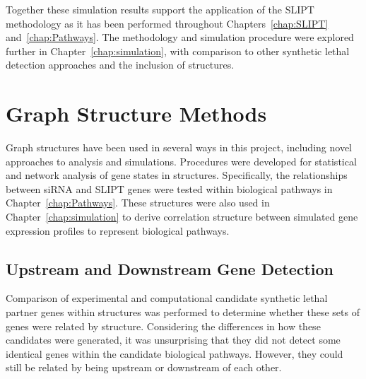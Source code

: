 Together these simulation results support the application of the \gls{SLIPT} methodology as it has been performed throughout Chapters~\ref{chap:SLIPT} and~\ref{chap:Pathways}. The methodology and simulation procedure were explored further in Chapter~\ref{chap:simulation}, with comparison to other \gls{synthetic lethal} detection approaches and the inclusion of  structures.

\FloatBarrier

\section{Graph Structure Methods}
Graph structures have been used in several ways in this project, including novel approaches to analysis and simulations. Procedures were developed for statistical and network analysis of gene states in  structures. Specifically, the relationships between \gls{siRNA} and \gls{SLIPT} genes were tested within biological pathways in Chapter~\ref{chap:Pathways}. These  structures were also used in Chapter~\ref{chap:simulation} to derive correlation structure between simulated \gls{gene expression} profiles to represent biological pathways.


\subsection{Upstream and Downstream Gene Detection} \label{methods:pathway_str} 
Comparison of experimental and computational candidate \gls{synthetic lethal} partner genes within  structures was performed to determine whether these sets of genes were related by  structure. Considering the differences in how these candidates were generated, it was unsurprising that they did not detect some identical genes within the candidate biological pathways. However, they could still be related by being upstream or downstream of each other. 

